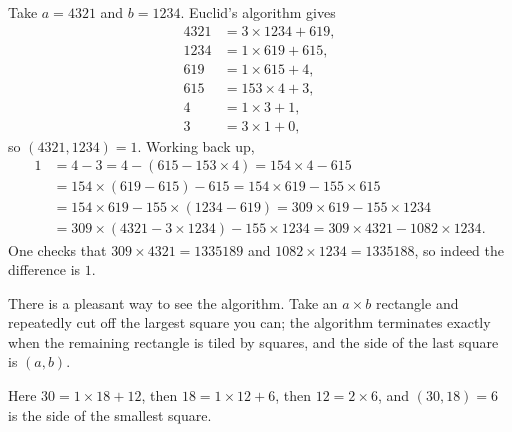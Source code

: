 \begin{example}
	Take $a = 4321$ and $b = 1234$. Euclid's algorithm gives
	\begin{align*}
		4321 &= 3 \times 1234 + 619, \\
		1234 &= 1 \times 619 + 615, \\
		619 &= 1 \times 615 + 4, \\
		615 &= 153 \times 4 + 3, \\
		4 &= 1 \times 3 + 1, \\
		3 &= 3 \times 1 + 0,
	\end{align*}
	so $(4321, 1234) = 1$. Working back up,
	\begin{align*}
		1 &= 4 - 3 = 4 - (615 - 153 \times 4) = 154 \times 4 - 615 \\
		&= 154 \times (619 - 615) - 615 = 154 \times 619 - 155 \times 615 \\
		&= 154 \times 619 - 155 \times (1234 - 619) = 309 \times 619 - 155 \times 1234 \\
		&= 309 \times (4321 - 3 \times 1234) - 155 \times 1234 = 309 \times 4321 - 1082 \times 1234.
	\end{align*}
	One checks that $309 \times 4321 = 1335189$ and $1082 \times 1234 = 1335188$, so indeed the difference is $1$.
\end{example}

There is a pleasant way to see the algorithm. Take an $a \times b$ rectangle and repeatedly cut off the largest square you can; the algorithm terminates exactly when the remaining rectangle is tiled by squares, and the side of the last square is $(a, b)$.

\begin{center}
\end{center}

Here $30 = 1 \times 18 + 12$, then $18 = 1 \times 12 + 6$, then $12 = 2 \times 6$, and $(30, 18) = 6$ is the side of the smallest square.


